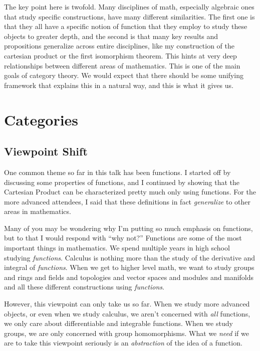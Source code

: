 \documentclass[11pt, letterpaper]{article}
\begin{document}
The key point here is twofold. Many disciplines of math, especially algebraic ones that study specific constructions, have many different similarities. The first one is that they all have a specific notion of function that they employ to study these objects to greater depth, and the second is that many key results and propositions generalize across entire disciplines, like my construction of the cartesian product or the first isomorphism theorem. This hints at very deep relationships between different areas of mathematics. This is one of the main goals of category theory. We would expect that there should be some unifying framework that explains this in a natural way, and this is what it gives us.

\section{Categories}

\subsection{Viewpoint Shift}

One common theme so far in this talk has been functions. I started off by discussing some properties of functions, and I continued by showing that the Cartesian Product can be characterized pretty much only using functions. For the more advanced attendees, I said that these definitions in fact \emph{generalize} to other areas in mathematics.

Many of you may be wondering why I'm putting so much emphasis on functions, but to that I would respond with ``why not?'' Functions are some of the most important things in mathematics. We spend multiple years in high school studying \emph{functions}. Calculus is nothing more than the study of the derivative and integral of \emph{functions}. When we get to higher level math, we want to study groups and rings and fields and topologies and vector spaces and modules and manifolds and all these different constructions using \emph{functions}.

However, this viewpoint can only take us so far. When we study more advanced objects, or even when we study calculus, we aren't concerned with \emph{all} functions, we only care about differentiable and integrable functions. When we study groups, we are only concerned with group homomorphisms. What we \emph{need} if we are to take this viewpoint seriously is an \emph{abstraction} of the idea of a function.
\end{document}
